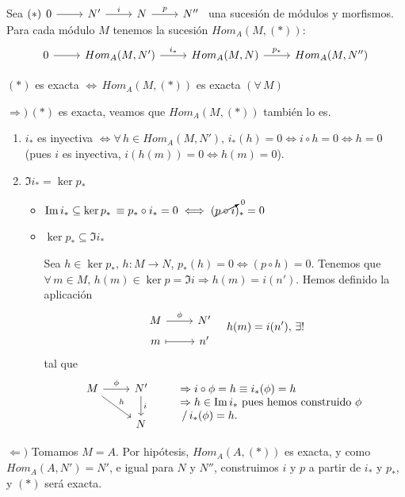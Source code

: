 Sea $(*) \bt 0\arrow{r} & N' \arrow{r}{i} & N \arrow{r}{p} &N'' \et$ una sucesi\'on de m\'odulos y morfismos. Para cada m\'odulo $M$ tenemos la sucesi\'on $Hom_A(M, (*))$:
$$ \bt 0\arrow{r} & Hom_A(M, N') \arrow{r}{i_*} & Hom_A(M, N) \arrow{r}{p_*} &  Hom_A(M, N'') \et$$
\begin{prop}
    $(*)$ es exacta $\iff \, Hom_A(M, (*))$ es exacta $(\forall \, M)$
\end{prop}
\begin{dem}
    $\Rightarrow ) \, (*)$ es exacta, veamos que $Hom_A(M, (*))$ tambi\'en lo es. 
    \begin{enumerate}[1)]
        \item $i_*$ es inyectiva $\iff \forall \, h \in Hom_A(M,N'), \, i_*(h) = 0 \iff i\circ h = 0 \iff h=0$ (pues $i$ es inyectiva, $i(h(m)) = 0 \iff h(m)=0$). 
        \item $\Im i_* = \ker  p_*$
        \begin{itemize}
            \item $\Im i_* \subseteq \ker p_* \, \equiv p_*\circ i_* = 0 \iff (\cancelto{0}{p\circ i})_* = 0$ 
            \item $\ker p_* \subseteq \Im i_*$

            Sea $h \in \ker  p_*, \, h:M\longrightarrow N$, $p_*(h) = 0 \iff (p \circ h) = 0$. Tenemos que $\forall\, m \in M, \, h(m) \in \ker p = \Im i \Rightarrow h(m)=i(n')$. Hemos definido la aplicaci\'on
            $$\bt M \arrow{r}{\phi} & N' \\[-5mm] m \arrow[mapsto]{r} & n' \et \quad h(m) = i(n'), \, \exists !$$
            tal que 
            $$\bt M \arrow{r}{\phi} \arrow{dr}{h} & N' \arrow{d}{i} \\ & N  \et \qquad \begin{array}{l}
                  \Rightarrow i \circ \phi = h \equiv i_*(\phi) = h  \\
                  \Rightarrow h \in \Im i_* \text{ pues hemos construido } \phi \\
                   \, / \, i_*(\phi) = h.
            \end{array}$$
        \end{itemize}
    \end{enumerate}
    $\Leftarrow)$ Tomamos $M=A$. Por hip\'otesis, $Hom_A(A,(*))$ es exacta, y como $Hom_A(A,N')=N'$, e igual para $N$ y $N''$, construimos $i$ y $p$ a partir de $i_*$ y $p_*$, y $(*)$ ser\'a exacta.
\end{dem}

